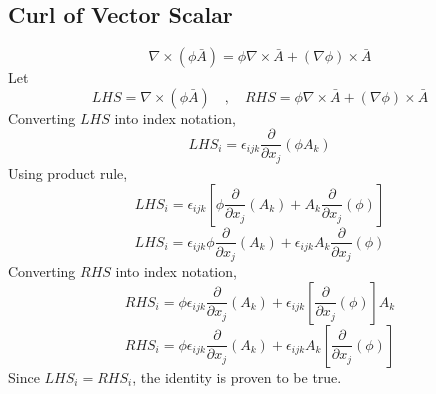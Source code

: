 \documentclass[a4paper, 12pt]{report}
\begin{document}
\begin{center}
\subsection{Curl of Vector Scalar}
\begin{comment}
\end{comment}
$$\nabla\times(\phi\bar{A}) = \phi\nabla\times\bar{A} + (\nabla\phi)\times\bar{A}$$
Let
$$LHS = \nabla\times(\phi\bar{A}) \quad,\quad RHS = \phi\nabla\times\bar{A} + (\nabla\phi)\times\bar{A}$$
Converting $LHS$ into index notation,
$$LHS_{i} = \epsilon_{ijk}\frac{\partial}{\partial x_{j}}(\phi A_{k})$$
Using product rule,
$$LHS_{i} = \epsilon_{ijk}\left[\phi\frac{\partial}{\partial x_{j}}( A_{k}) + A_{k}\frac{\partial}{\partial x_{j}}(\phi )\right]$$
$$LHS_{i} = \epsilon_{ijk}\phi\frac{\partial}{\partial x_{j}}( A_{k}) + \epsilon_{ijk}A_{k}\frac{\partial}{\partial x_{j}}(\phi)$$
Converting $RHS$ into index notation,
$$RHS_{i} = \phi\epsilon_{ijk}\frac{\partial}{\partial x_{j}}(A_{k}) + \epsilon_{ijk}\left[\frac{\partial}{\partial x_{j}}(\phi)\right]A_{k}$$
$$RHS_{i} = \phi\epsilon_{ijk}\frac{\partial}{\partial x_{j}}(A_{k}) + \epsilon_{ijk}A_{k}\left[\frac{\partial}{\partial x_{j}}(\phi)\right]$$
Since $LHS_{i} = RHS_{i}$, the identity is proven to be true.

\end{center}
\end{document}
